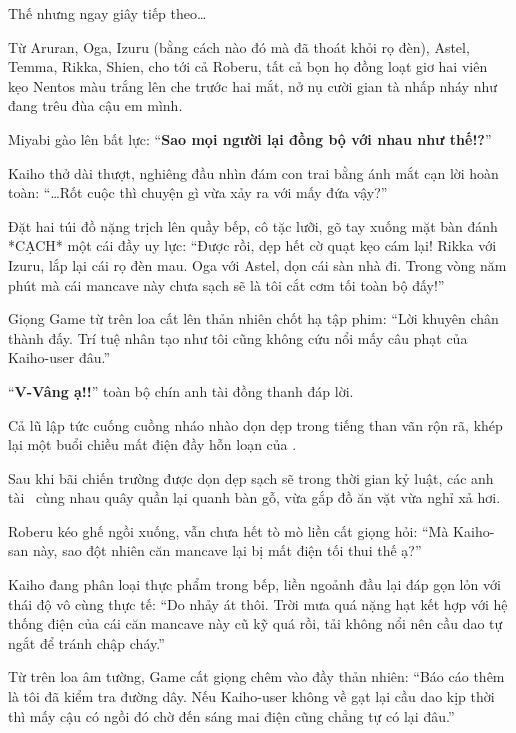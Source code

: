 \documentclass[../main.tex]{subfiles}
\begin{document}
Thế nhưng ngay giây tiếp theo\dots

Từ Aruran, Oga, Izuru (bằng cách nào đó mà đã thoát khỏi rọ đèn), Astel, Temma, Rikka, Shien, cho tới cả Roberu, tất cả bọn họ đồng loạt giơ hai viên kẹo Nentos màu trắng lên che trước hai mắt, nở nụ cười gian tà nhấp nháy như đang trêu đùa cậu em mình.


Miyabi gào lên bất lực: ``\textbf{Sao mọi người lại đồng bộ với nhau như thế!?}''

Kaiho thở dài thượt, nghiêng đầu nhìn đám con trai bằng ánh mắt cạn lời hoàn toàn: ``\dots Rốt cuộc thì chuyện gì vừa xảy ra với mấy đứa vậy?''

Đặt hai túi đồ nặng trịch lên quầy bếp, cô tặc lưỡi, gõ tay xuống mặt bàn đánh *CẠCH* một cái đầy uy lực: ``Được rồi, dẹp hết cờ quạt kẹo cám lại! Rikka với Izuru, lắp lại cái rọ đèn mau. Oga với Astel, dọn cái sàn nhà đi. Trong vòng năm phút mà cái mancave này chưa sạch sẽ là tôi cắt cơm tối toàn bộ đấy!''

Giọng Game từ trên loa cất lên thản nhiên chốt hạ tập phim: ``Lời khuyên chân thành đấy. Trí tuệ nhân tạo như tôi cũng không cứu nổi mấy câu phạt của Kaiho-user đâu.''

``\textbf{V-Vâng ạ!!}'' toàn bộ chín anh tài đồng thanh đáp lời.

Cả lũ lập tức cuống cuồng nháo nhào dọn dẹp trong tiếng than vãn rộn rã, khép lại một buổi chiều mất điện đầy hỗn loạn của \hls.

\omk

Sau khi bãi chiến trường được dọn dẹp sạch sẽ trong thời gian kỷ luật, các anh tài \hls\ cùng nhau quây quần lại quanh bàn gỗ, vừa gắp đồ ăn vặt vừa nghỉ xả hơi.

Roberu kéo ghế ngồi xuống, vẫn chưa hết tò mò liền cất giọng hỏi: ``Mà Kaiho-san này, sao đột nhiên căn mancave lại bị mất điện tối thui thế ạ?''

Kaiho đang phân loại thực phẩm trong bếp, liền ngoảnh đầu lại đáp gọn lỏn với thái độ vô cùng thực tế: ``Do nhảy át thôi. Trời mưa quá nặng hạt kết hợp với hệ thống điện của cái căn mancave này cũ kỹ quá rồi, tải không nổi nên cầu dao tự ngắt để tránh chập cháy.''

Từ trên loa âm tường, Game cất giọng chêm vào đầy thản nhiên: ``Báo cáo thêm là tôi đã kiểm tra đường dây. Nếu Kaiho-user không về gạt lại cầu dao kịp thời thì mấy cậu có ngồi đó chờ đến sáng mai điện cũng chẳng tự có lại đâu.''
\end{document}
